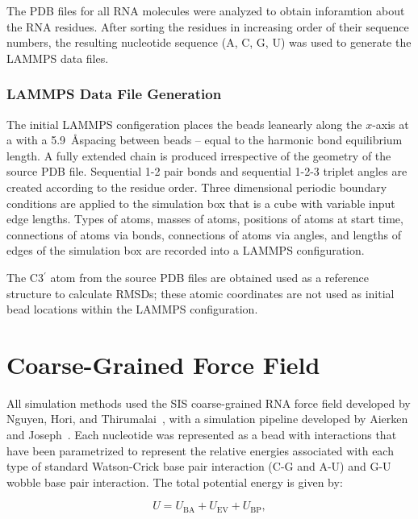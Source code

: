 The PDB files for all RNA molecules were analyzed to obtain inforamtion about the RNA residues. After sorting the residues in increasing order of their sequence numbers, the resulting nucleotide sequence (A, C, G, U) was used to generate the LAMMPS data files.


\subsubsection{LAMMPS Data File Generation}

The initial LAMMPS configeration places the beads leanearly along the $x$-axis at a with a 5.9~\AA \space spacing between beads -- equal to the harmonic bond equilibrium length. A fully extended chain is produced irrespective of the geometry of the source PDB file. Sequential 1-2 pair bonds and sequential 1-2-3 triplet angles are created according to the residue order. Three dimensional periodic boundary conditions are applied to the simulation box that is a cube with variable input edge lengths. Types of atoms, masses of atoms, positions of atoms at start time, connections of atoms via bonds, connections of atoms via angles, and lengths of edges of the simulation box are recorded into a LAMMPS configuration. 


The C3$^\prime$ atom from the source PDB files are obtained used as a reference structure to calculate RMSDs; these atomic coordinates are not used as initial bead locations within the LAMMPS configuration.


\section{Coarse-Grained Force Field}
\label{sec:forcefield}

All simulation methods used the SIS coarse-grained RNA force field developed by Nguyen, Hori, and Thirumalai~\cite{Aierken2024}, with a simulation pipeline developed by Aierken and Joseph~\cite{Aierken2024}. Each nucleotide was represented as a bead with interactions that have been parametrized to represent the relative energies associated with each type of standard Watson-Crick base pair interaction (C-G and A-U) and G-U wobble base pair interaction. The total potential energy is given by:

\begin{equation}
  U = U_{\mathrm{BA}} + U_{\mathrm{EV}} + U_{\mathrm{BP}},
  \label{eq:Utot}
\end{equation}

